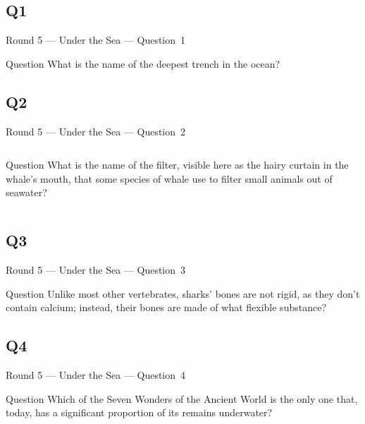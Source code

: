 \documentclass[11pt]{beamer}
\begin{document}
\subsection*{Q1}
\begin{frame}[t]{Round 5 --- Under the Sea --- \mbox{Question 1}}
\vspace{-0.5em}
\begin{block}{Question}
What is the name of the deepest trench in the ocean?
\end{block}
\end{frame}
\subsection*{Q2}
\begin{frame}[t]{Round 5 --- Under the Sea --- \mbox{Question 2}}
\vspace{-0.5em}
\begin{columns}[T,totalwidth=\linewidth]
\begin{column}{0.32\linewidth}
\begin{block}{Question}
What is the name of the filter, visible here as the hairy curtain in the whale's mouth, that some species of whale use to filter small animals out of seawater?
\end{block}
\end{column}
\begin{column}{0.65\linewidth}
\begin{center}
\texttt{[image: \{Images/baleen]}.jpg}
\end{center}
\end{column}
\end{columns}
\end{frame}
\subsection*{Q3}
\begin{frame}[t]{Round 5 --- Under the Sea --- \mbox{Question 3}}
\vspace{-0.5em}
\begin{block}{Question}
Unlike most other vertebrates, sharks' bones are not rigid, as they don't contain calcium; instead, their bones are made of what flexible substance?
\end{block}
\end{frame}
\subsection*{Q4}
\begin{frame}[t]{Round 5 --- Under the Sea --- \mbox{Question 4}}
\vspace{-0.5em}
\begin{block}{Question}
Which of the Seven Wonders of the Ancient World is the only one that, today, has a significant proportion of its remains underwater?
\end{block}
\end{frame}
\end{document}
